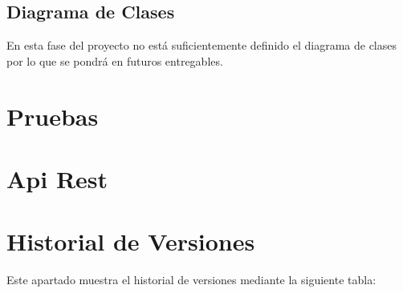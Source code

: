 \documentclass{scrartcl}
\begin{document}
\subsection{Diagrama de Clases}
En esta fase del proyecto no está suficientemente definido el diagrama de clases por lo que se pondrá en futuros entregables.
\section{Pruebas}\label{cap:pruebas}
\section{Api Rest}\label{cap:apiRest}
\section{Historial de Versiones}
Este apartado muestra el historial de versiones mediante la siguiente tabla:
\\
\end{document}
